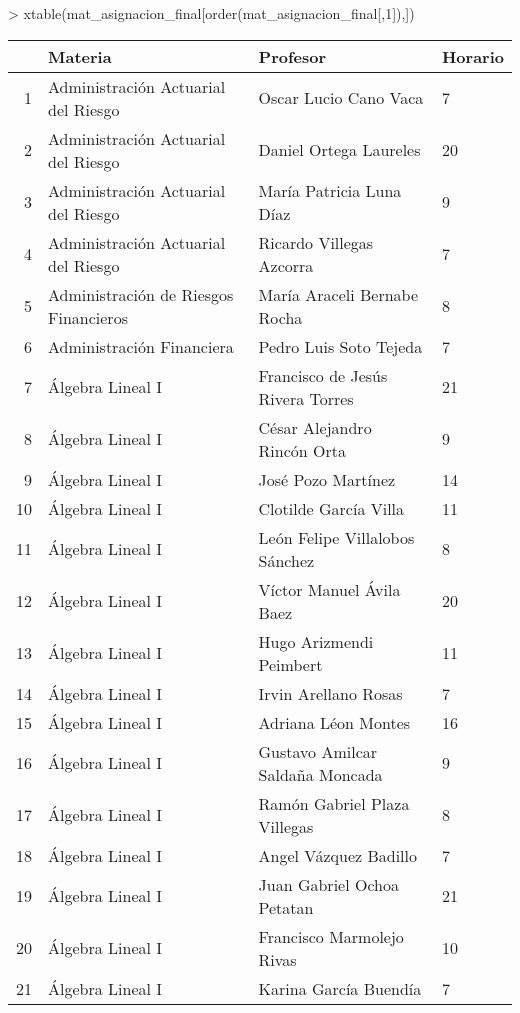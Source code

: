 > xtable(mat_asignacion_final[order(mat_asignacion_final[,1]),])
\begin{table}[ht]
\centering
\begin{tabular}{rlll}
  \hline
 & Materia & Profesor & Horario \\ 
  \hline
1 & Administración Actuarial del Riesgo & Oscar Lucio Cano Vaca & 7 \\ 
  2 & Administración Actuarial del Riesgo & Daniel Ortega Laureles & 20 \\ 
  3 & Administración Actuarial del Riesgo & María Patricia Luna Díaz & 9 \\ 
  4 & Administración Actuarial del Riesgo & Ricardo Villegas Azcorra & 7 \\ 
  5 & Administración de Riesgos Financieros & María Araceli Bernabe Rocha & 8 \\ 
  6 & Administración Financiera & Pedro Luis Soto Tejeda & 7 \\ 
  7 & Álgebra Lineal I & Francisco de Jesús Rivera Torres & 21 \\ 
  8 & Álgebra Lineal I & César Alejandro Rincón Orta & 9 \\ 
  9 & Álgebra Lineal I & José Pozo Martínez & 14 \\ 
  10 & Álgebra Lineal I & Clotilde García Villa & 11 \\ 
  11 & Álgebra Lineal I & León Felipe Villalobos Sánchez & 8 \\ 
  12 & Álgebra Lineal I & Víctor Manuel Ávila Baez & 20 \\ 
  13 & Álgebra Lineal I & Hugo Arizmendi Peimbert & 11 \\ 
  14 & Álgebra Lineal I & Irvin Arellano Rosas & 7 \\ 
  15 & Álgebra Lineal I & Adriana Léon Montes & 16 \\ 
  16 & Álgebra Lineal I & Gustavo Amilcar Saldaña Moncada & 9 \\ 
  17 & Álgebra Lineal I & Ramón Gabriel Plaza Villegas & 8 \\ 
  18 & Álgebra Lineal I & Angel Vázquez Badillo & 7 \\ 
  19 & Álgebra Lineal I & Juan Gabriel Ochoa Petatan & 21 \\ 
  20 & Álgebra Lineal I & Francisco Marmolejo Rivas & 10 \\ 
  21 & Álgebra Lineal I & Karina García Buendía & 7 \\ 

\end{tabular}
\end{table}
